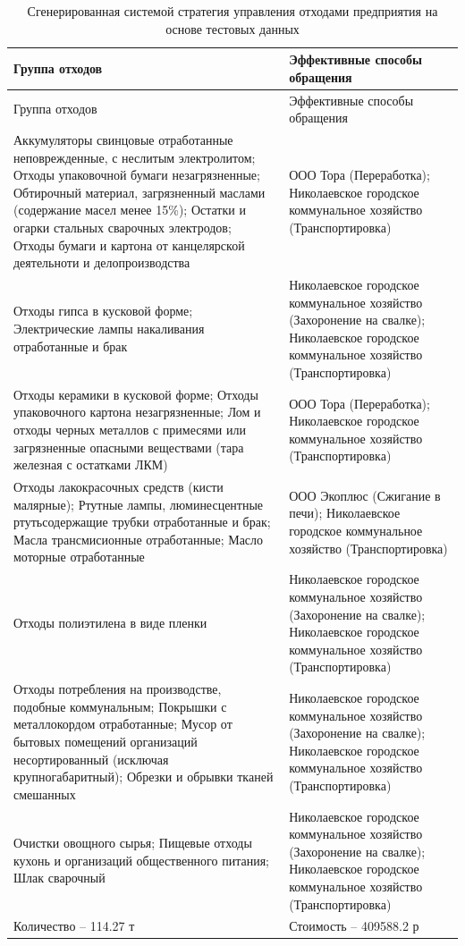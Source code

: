 \documentclass[a4paper]{G2-105}
\begin{document}
\begin{longtable}[l]{|p{7.5cm}|p{7.5cm}|}
\caption{Сгенерированная системой стратегия управления отходами предприятия на основе тестовых данных}
\label{tab:test_results}\tabularnewline
\hline
Группа отходов & Эффективные способы обращения \tabularnewline
\endfirsthead
\hline
Группа отходов & Эффективные способы обращения \tabularnewline
\endhead
\hline
Аккумуляторы свинцовые отработанные неповрежденные, с неслитым электролитом;
Отходы упаковочной бумаги незагрязненные; Обтирочный материал, загрязненный маслами (содержание масел менее 15\%); Остатки и огарки стальных сварочных электродов; Отходы бумаги и картона от канцелярской деятельноти и делопроизводства & ООО Тора (Переработка); Николаевское городское коммунальное хозяйство (Транспортировка) \tabularnewline
\hline
Отходы гипса в кусковой форме; Электрические лампы накаливания отработанные и брак & Николаевское городское коммунальное хозяйство (Захоронение на свалке); Николаевское городское коммунальное хозяйство (Транспортировка) \tabularnewline
\hline
Отходы керамики в кусковой форме; Отходы упаковочного картона незагрязненные; Лом и отходы черных металлов с примесями или загрязненные опасными веществами (тара железная с остатками ЛКМ) & ООО Тора (Переработка); Николаевское городское коммунальное хозяйство (Транспортировка) \tabularnewline
\hline
Отходы лакокрасочных средств (кисти малярные); Ртутные лампы, люминесцентные ртутьсодержащие трубки отработанные и брак; Масла трансмисионные отработанные; Масло моторные отработанные & ООО Экоплюс (Сжигание в печи); Николаевское городское коммунальное хозяйство (Транспортировка) \tabularnewline
\hline
Отходы полиэтилена в виде пленки & Николаевское городское коммунальное хозяйство (Захоронение на свалке); Николаевское городское коммунальное хозяйство (Транспортировка) \tabularnewline
\hline
Отходы потребления на производстве, подобные коммунальным; Покрышки с металлокордом отработанные; Мусор от бытовых помещений организаций несортированный (исключая крупногабаритный); Обрезки и обрывки тканей смешанных & Николаевское городское коммунальное хозяйство (Захоронение на свалке); Николаевское городское коммунальное хозяйство (Транспортировка) \tabularnewline
\hline
Очистки овощного сырья; Пищевые отходы кухонь и организаций общественного питания; Шлак сварочный & Николаевское городское коммунальное хозяйство (Захоронение на свалке); Николаевское городское коммунальное хозяйство (Транспортировка) \tabularnewline
\hline
Количество -- 114.27 т & Стоимость -- 409588.2 р \tabularnewline
\end{longtable}
\end{document}
